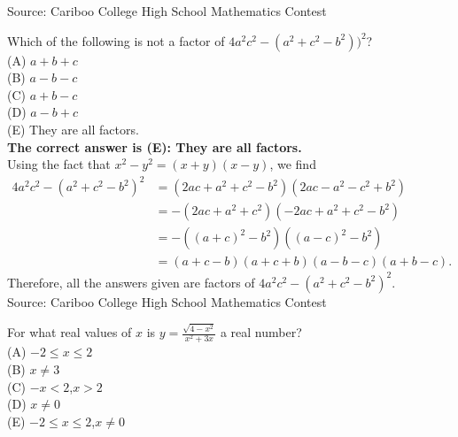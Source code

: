 \documentclass{article}
\begin{document}
\scriptsize
Source: Cariboo College High School Mathematics Contest

\normalsize
Which of the following is not a factor of $4a^{2}c^{2}-(a^{2}+c^{2}-b^{2}))^2$?\\
(A) $a+b+c$\\
(B) $a-b-c$\\
(C) $a+b-c$\\
(D) $a-b+c$\\
(E) They are all factors.\\


\textbf{The correct answer is (E): They are all factors.}\\[1 ex]
Using the fact that $x^2-y^2=(x+y)(x-y)$, we find
\begin{align*}
4a^{2}c^{2}-(a^2+c^2-b^2)^2&=(2ac +a^2+c^2-b^2)(2ac-a^2-c^2+b^2)\\
&=-(2ac +a^2+c^2)(-2ac+a^2+c^2-b^2)\\
&=-((a+c)^2-b^2)((a-c)^2-b^2)\\
&=(a+c-b)(a+c+b)(a-b-c)(a+b-c).
\end{align*}
Therefore, all the answers given are factors of $4a^{2}c^{2}-(a^2+c^2-b^2)^2$.
\\[5 ex]

\scriptsize
Source: Cariboo College High School Mathematics Contest

\normalsize
For what real values of $x$ is $y=\frac{\sqrt{4-x^2}}{x^2+3x}$ a real number?\\
(A) $-2\leq x\leq2$\\
(B) $x\neq3$\\
(C) $-x<2$,$x>2$\\
(D) $x\neq0$\\
(E) $-2\leq x\leq 2$,$x\neq0$\\
\end{document}
